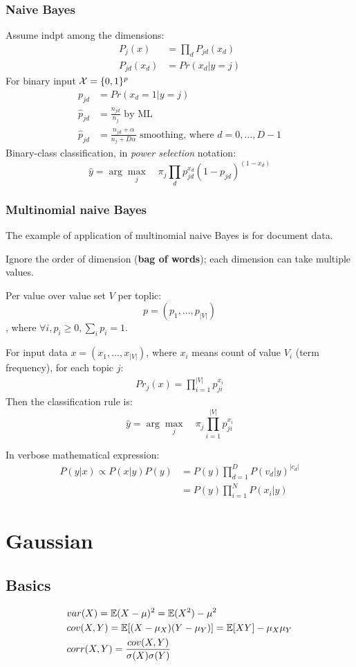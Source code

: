 \documentclass[a4paper]{report}
\begin{document}
\subsubsection{Naive Bayes}
Assume indpt among the dimensions:
\begin{align*}
P_j(x) &= \prod_d P_{jd}(x_d) \\
P_{jd}(x_d) &= Pr(x_d|y=j) 
\end{align*}
For binary input $\mathcal{X}=\{0, 1\}^p$
\begin{align*}
p_{jd} &= Pr(x_d=1|y=j)\\
\hat p_{jd} &= \frac{n_{jd}}{n_{j}} \text{ by ML}\\
\hat p_{jd} &= \frac{n_{jd}+\alpha}{n_{j}+D\alpha} \text{ smoothing, where } d= 0,...,D-1
\end{align*}
Binary-class classification, in \textit{power selection} notation:
$$
\hat y = \arg\max_j \quad \pi_j \prod_d p_{jd}^{x_d}(1-p_{jd})^{(1-x_d)}
$$
\subsubsection{Multinomial naive Bayes}
The example of application of multinomial naive Bayes is for document data. 

Ignore the order of dimension (\textbf{bag of words}); each dimension can take multiple values.

Per value over value set $V$ per toplic:
$$
p = (p_1,..., p_{|V|})
$$
, where $\forall i, p_i\geq 0, \sum_i p_i=1$.

For input data $x=(x_1, ..., x_{|V|})$, where $x_i$ means count of value $V_i$ (term frequency), for each topic $j$:
\begin{align*}
Pr_j(x) = \prod_{i=1}^{|V|}p_{ji}^{x_i}
\end{align*}
Then the classification rule is: 
$$
\hat y = \arg \max_j\quad \pi_j \prod_{i=1}^{|V|}p_{ji}^{x_i}
$$

In verbose mathematical expression:
\begin{align*}
P(y|x)\propto P(x|y)P(y)&=P(y)\prod_{d=1}^{D}P(v_d|y)^{|c_d|}\\
&=P(y)\prod_{i=1}^{N}P(x_i|y)
\end{align*}
\section{Gaussian}
\subsection{Basics}
\begin{align*}
& var(X) = \mathbb{E}(X-\mu)^2 = \mathbb{E}(X^2)-\mu^2 \\
& cov(X, Y) = \mathbb{E}[(X-\mu_X)(Y-\mu_Y)] = \mathbb{E}[XY]-\mu_X\mu_Y \\
& corr(X, Y) = \frac{cov(X, Y)}{\sigma(X)\sigma(Y)}
\end{align*}
\end{document}
